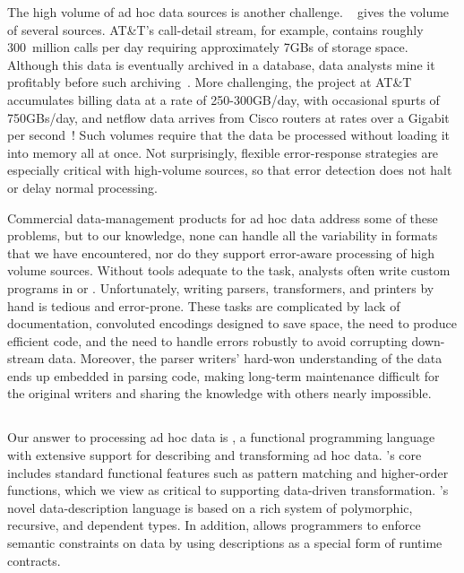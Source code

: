 The high volume of ad hoc data sources is another challenge.
~ gives the volume of several sources.
AT\&T's call-detail stream, for example, contains roughly 300~million
calls per day requiring approximately 7GBs of storage space.  Although
this data is eventually archived in a database, data analysts mine it
profitably before such archiving~\cite{kdd98,kdd99}.  More
challenging, the \ningaui{} project at AT\&T accumulates billing data
at a rate of 250-300GB/day, with occasional spurts of 750GBs/day, and
netflow data arrives from Cisco routers at rates over a Gigabit per
second~\cite{gigascope}!  Such volumes require that the data be
processed without loading it into memory all at once.  Not
surprisingly, flexible error-response strategies are especially
critical with high-volume sources, so that error detection does not
halt or delay normal processing.


Commercial data-management products for ad hoc data address 
some of these problems, but to our knowledge, none can handle all the variability
in formats that we have encountered, nor do they support error-aware
processing of high volume sources.  Without tools adequate to the
task, analysts often write custom programs in \C{} or \perl{}.
Unfortunately, writing parsers, transformers, and printers by hand is
tedious and error-prone.  These tasks are complicated by lack of
documentation, convoluted encodings designed to save space, the need
to produce efficient code, and the need to handle errors robustly to
avoid corrupting down-stream data.  Moreover, the parser writers'
hard-won understanding of the data ends up embedded in parsing code,
making long-term maintenance difficult for the original writers and
sharing the knowledge with others nearly impossible.

\subsection{\datatypebig{}}

Our answer to processing ad hoc data is \datatype{}, a functional
programming language with extensive support for describing and
transforming ad hoc data.  \datatype{}'s core includes standard
functional features such as pattern matching and higher-order
functions, which we view as critical to supporting data-driven
transformation.  \datatype{}'s novel data-description language is
based on a rich system of polymorphic, recursive, and dependent types.
In addition, \datatype{} allows programmers to
enforce semantic constraints on data by using \datatype{} descriptions
as a special form of runtime contracts.

